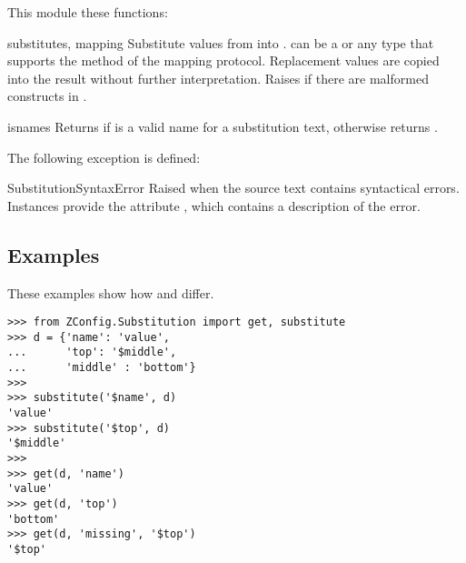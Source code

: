 \documentclass{howto}
\begin{document}
This module these functions:

\begin{funcdesc}{substitute}{s, mapping}
  Substitute values from  into .  
  can be a  or any type that supports the 
  method of the mapping protocol.  Replacement
  values are copied into the result without further interpretation.
  Raises  if there are malformed
  constructs in .
\end{funcdesc}

\begin{funcdesc}{isname}{s}
  Returns  if  is a valid name for a substitution
  text, otherwise returns .
\end{funcdesc}

The following exception is defined:

\begin{excdesc}{SubstitutionSyntaxError}
  Raised when the source text contains syntactical errors.  Instances
  provide the attribute , which contains a description
  of the error.
\end{excdesc}


\subsection{Examples}

These examples show how  and 
differ.

\begin{verbatim}
>>> from ZConfig.Substitution import get, substitute
>>> d = {'name': 'value',
...      'top': '$middle',
...      'middle' : 'bottom'}
>>>
>>> substitute('$name', d)
'value'
>>> substitute('$top', d)
'$middle'
>>>
>>> get(d, 'name')
'value'
>>> get(d, 'top')
'bottom'
>>> get(d, 'missing', '$top')
'$top'
\end{verbatim}
\end{document}
